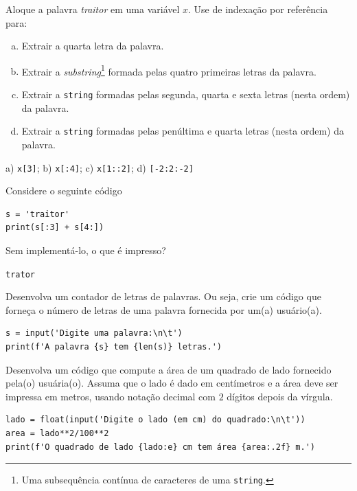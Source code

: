 \begin{exer}
  Aloque a palavra \textit{traitor} em uma variável $x$. Use de indexação por referência para:
  \begin{enumerate}[a)]
  \item Extrair a quarta letra da palavra.
  \item Extrair a \textit{substring}\footnote{Uma subsequência contínua de caracteres de uma \texttt{string}.} formada pelas quatro primeiras letras da palavra.
  \item Extrair a \texttt{string} formadas pelas segunda, quarta e sexta letras (nesta ordem) da palavra.
  \item Extrair a \texttt{string} formadas pelas penúltima e quarta letras (nesta ordem) da palavra.
  \end{enumerate}
\end{exer}
\begin{resp}
  a) \lstinline+x[3]+; b) \lstinline+x[:4]+; c) \lstinline+x[1::2]+; d) \lstinline+[-2:2:-2]+
\end{resp}

\begin{exer}
  Considere o seguinte código

  \begin{lstlisting}
s = 'traitor'
print(s[:3] + s[4:])
\end{lstlisting}

Sem implementá-lo, o que é impresso?
\end{exer}
\begin{resp}
  \lstinline+trator+
\end{resp}

\begin{exer}
  Desenvolva um contador de letras de palavras. Ou seja, crie um código que forneça o número de letras de uma palavra fornecida por um(a) usuário(a).
\end{exer}
\begin{resp}

\begin{lstlisting}
s = input('Digite uma palavra:\n\t')
print(f'A palavra {s} tem {len(s)} letras.')
\end{lstlisting}

\end{resp}

\begin{exer}
  Desenvolva um código que compute a área de um quadrado de lado fornecido pela(o) usuária(o). Assuma que o lado é dado em centímetros e a área deve ser impressa em metros, usando notação decimal com $2$ dígitos depois da vírgula.
\end{exer}
\begin{resp}

\begin{lstlisting}
lado = float(input('Digite o lado (em cm) do quadrado:\n\t'))
area = lado**2/100**2
print(f'O quadrado de lado {lado:e} cm tem área {area:.2f} m.')
\end{lstlisting}

\end{resp}

